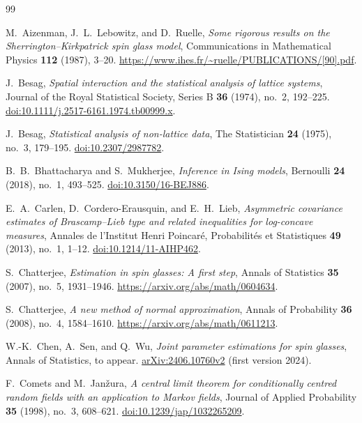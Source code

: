 \documentclass[11pt]{amsart}
\numberwithin{equation}{section}
\theoremstyle{remark}
\begin{document}
\begin{thebibliography}{99}

M.~Aizenman, J.~L.~Lebowitz, and D.~Ruelle,
\emph{Some rigorous results on the Sherrington--Kirkpatrick spin glass model},
Communications in Mathematical Physics \textbf{112} (1987), 3--20.
\url{https://www.ihes.fr/~ruelle/PUBLICATIONS/[90].pdf}.

J.~Besag,
\emph{Spatial interaction and the statistical analysis of lattice systems},
Journal of the Royal Statistical Society, Series B \textbf{36} (1974), no.~2, 192--225.
\href{https://doi.org/10.1111/j.2517-6161.1974.tb00999.x}{doi:10.1111/j.2517-6161.1974.tb00999.x}.

J.~Besag,
\emph{Statistical analysis of non-lattice data},
The Statistician \textbf{24} (1975), no.~3, 179--195.
\href{https://doi.org/10.2307/2987782}{doi:10.2307/2987782}.

B.~B.~Bhattacharya and S.~Mukherjee,
\emph{Inference in Ising models},
Bernoulli \textbf{24} (2018), no.~1, 493--525.
\href{https://doi.org/10.3150/16-BEJ886}{doi:10.3150/16-BEJ886}.

E.~A.~Carlen, D.~Cordero-Erausquin, and E.~H.~Lieb,
\emph{Asymmetric covariance estimates of Brascamp--Lieb type and related inequalities for log-concave measures},
Annales de l'Institut Henri Poincar\'e, Probabilit\'es et Statistiques
\textbf{49} (2013), no.~1, 1--12.
\href{https://doi.org/10.1214/11-AIHP462}{doi:10.1214/11-AIHP462}.

S.~Chatterjee,
\emph{Estimation in spin glasses: A first step},
Annals of Statistics \textbf{35} (2007), no.~5, 1931--1946.
\url{https://arxiv.org/abs/math/0604634}.

S.~Chatterjee,
\emph{A new method of normal approximation},
Annals of Probability \textbf{36} (2008), no.~4, 1584--1610.
\url{https://arxiv.org/abs/math/0611213}.

W.-K.~Chen, A.~Sen, and Q.~Wu,
\emph{Joint parameter estimations for spin glasses},
Annals of Statistics, to appear.
\href{https://arxiv.org/abs/2406.10760v2}{arXiv:2406.10760v2} (first version 2024).

F.~Comets and M.~Jan\v{z}ura,
\emph{A central limit theorem for conditionally centred random fields with an application to Markov fields},
Journal of Applied Probability \textbf{35} (1998), no.~3, 608--621.
\href{https://doi.org/10.1239/jap/1032265209}{doi:10.1239/jap/1032265209}.


\end{thebibliography}
\end{document}
